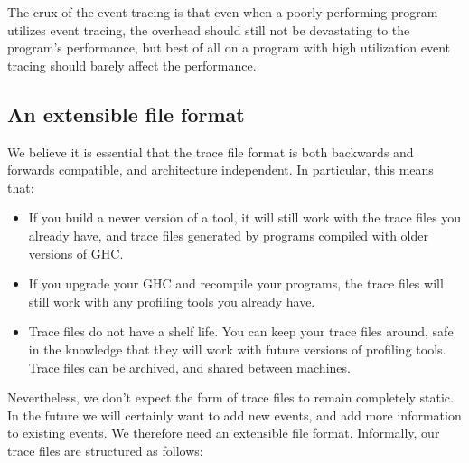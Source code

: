 The crux of the event tracing is that even when a poorly performing
program utilizes event tracing, the overhead should still not be
devastating to the program's performance, but best of all on a program
with high utilization event tracing should barely affect the performance.

\subsection{An extensible file format}

We believe it is essential that the trace file format is both
backwards and forwards compatible, and architecture independent.  In
particular, this means that:

\begin{itemize}
\item If you build a newer version of a tool, it will still work with
  the trace files you already have, and trace files generated by
  programs compiled with older versions of GHC.

\item If you upgrade your GHC and recompile your programs, the trace
  files will still work with any profiling tools you already have.

\item Trace files do not have a shelf life.  You can keep your trace
  files around, safe in the knowledge that they will work with future
  versions of profiling tools.  Trace files can be archived, and
  shared between machines.
\end{itemize}

Nevertheless, we don't expect the form of trace files to remain
completely static.  In the future we will certainly want to add new
events, and add more information to existing events.  We therefore
need an extensible file format.  Informally, our trace files are
structured as follows:


